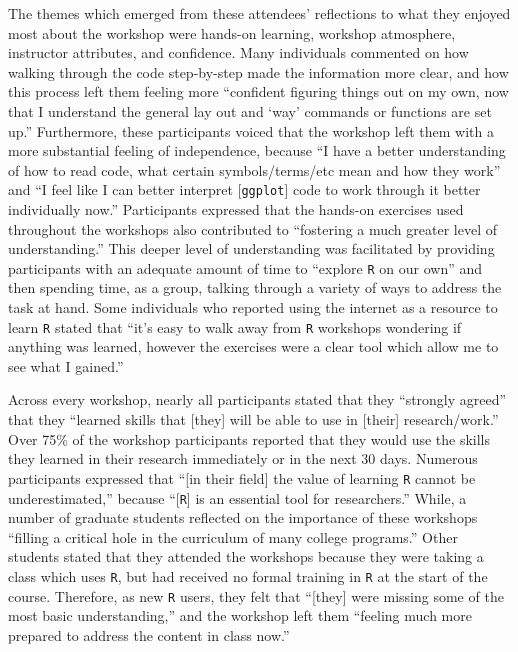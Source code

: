 \documentclass[12pt]{article}
\begin{document}
\quad The themes which emerged from these attendees' reflections to what they enjoyed most about the workshop were hands-on learning, workshop atmosphere, instructor attributes, and confidence. Many individuals commented on how walking through the code step-by-step made the information more clear, and how this process left them feeling more ``confident figuring things out on my own, now that I understand the general lay out and `way' commands or functions are set up.'' Furthermore, these participants voiced that the workshop left them with a more substantial feeling of independence, because ``I have a better understanding of how to read code, what certain symbols/terms/etc mean and how they work'' and ``I feel like I can better interpret [\texttt{ggplot}] code to work through it better individually now.'' Participants expressed that the hands-on exercises used throughout the workshops also contributed to ``fostering a much greater level of understanding.'' This deeper level of understanding was facilitated by providing participants with an adequate amount of time to ``explore \texttt{R} on our own'' and then spending time, as a group, talking through a variety of ways to address the task at hand. Some individuals who reported using the internet as a resource to learn \texttt{R} stated that ``it's easy to walk away from \texttt{R} workshops wondering if anything was learned, however the exercises were a clear tool which allow me to see what I gained.''  

\quad Across every workshop, nearly all participants stated that they ``strongly agreed'' that they ``learned skills that [they] will be able to use in [their] research/work.'' Over 75\% of the workshop participants reported that they would use the skills they learned in their research immediately or in the next 30 days. Numerous participants expressed that ``[in their field] the value of learning \texttt{R} cannot be underestimated,'' because ``[\texttt{R}] is an essential tool for researchers.'' While, a number of graduate students reflected on the importance of these workshops ``filling a critical hole in the curriculum of many college programs.'' Other students stated that they attended the workshops because they were taking a class which uses \texttt{R}, but had received no formal training in \texttt{R} at the start of the course. Therefore, as new \texttt{R} users, they felt that ``[they] were missing some of the most basic understanding,'' and the workshop left them ``feeling much more prepared to address the content in class now.''   
\end{document}
